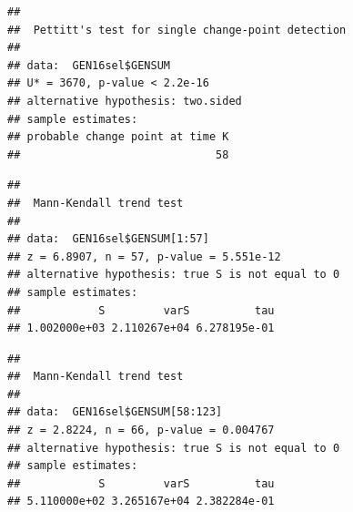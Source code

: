 \documentclass[12pt,]{article}
\newenvironment{Shaded}{\begin{snugshade}}{\end{snugshade}}
\newcommand{\KeywordTok}[1]{\textcolor[rgb]{0.13,0.29,0.53}{\textbf{#1}}}
\newcommand{\DecValTok}[1]{\textcolor[rgb]{0.00,0.00,0.81}{#1}}
\newcommand{\CommentTok}[1]{\textcolor[rgb]{0.56,0.35,0.01}{\textit{#1}}}
\newcommand{\OperatorTok}[1]{\textcolor[rgb]{0.81,0.36,0.00}{\textbf{#1}}}
\newcommand{\NormalTok}[1]{#1}
\begin{document}
\begin{Shaded}
\end{Shaded}

\begin{verbatim}
## 
##  Pettitt's test for single change-point detection
## 
## data:  GEN16sel$GENSUM
## U* = 3670, p-value < 2.2e-16
## alternative hypothesis: two.sided
## sample estimates:
## probable change point at time K 
##                              58
\end{verbatim}

\begin{Shaded}
\end{Shaded}

\begin{verbatim}
## 
##  Mann-Kendall trend test
## 
## data:  GEN16sel$GENSUM[1:57]
## z = 6.8907, n = 57, p-value = 5.551e-12
## alternative hypothesis: true S is not equal to 0
## sample estimates:
##            S         varS          tau 
## 1.002000e+03 2.110267e+04 6.278195e-01
\end{verbatim}

\begin{Shaded}
\end{Shaded}

\begin{verbatim}
## 
##  Mann-Kendall trend test
## 
## data:  GEN16sel$GENSUM[58:123]
## z = 2.8224, n = 66, p-value = 0.004767
## alternative hypothesis: true S is not equal to 0
## sample estimates:
##            S         varS          tau 
## 5.110000e+02 3.265167e+04 2.382284e-01
\end{verbatim}
\end{document}
